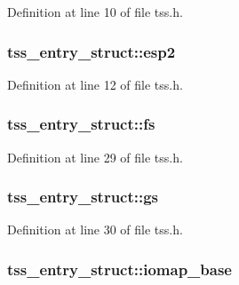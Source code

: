 Definition at line 10 of file tss.h.

\hypertarget{structtss__entry__struct_a146fdb1a95ce3161160577904c01dd79}{
\subsubsection[{esp2}]{ {\bf tss\_\-entry\_\-struct::esp2}}}
\label{structtss__entry__struct_a146fdb1a95ce3161160577904c01dd79}


Definition at line 12 of file tss.h.

\hypertarget{structtss__entry__struct_ad548bb99c7ae46679ff510500fca2632}{
\subsubsection[{fs}]{ {\bf tss\_\-entry\_\-struct::fs}}}
\label{structtss__entry__struct_ad548bb99c7ae46679ff510500fca2632}


Definition at line 29 of file tss.h.

\hypertarget{structtss__entry__struct_ad40674cac2cc92077a912ffb6871b105}{
\subsubsection[{gs}]{ {\bf tss\_\-entry\_\-struct::gs}}}
\label{structtss__entry__struct_ad40674cac2cc92077a912ffb6871b105}


Definition at line 30 of file tss.h.

\hypertarget{structtss__entry__struct_a89c1c2ef1296ca90699fc54876a31017}{
\subsubsection[{iomap\_\-base}]{ {\bf tss\_\-entry\_\-struct::iomap\_\-base}}}
\label{structtss__entry__struct_a89c1c2ef1296ca90699fc54876a31017}


